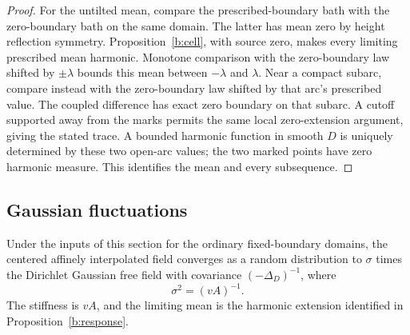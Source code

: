\begin{proof}
For the untilted mean, compare the prescribed-boundary bath with the
zero-boundary bath on the same domain. The latter has mean zero by height
reflection symmetry. Proposition~\ref{b:cell}, with source zero, makes
every limiting prescribed mean harmonic. Monotone comparison with the
zero-boundary law shifted by $\pm\lambda$ bounds this mean between
$-\lambda$ and $\lambda$. Near a compact subarc, compare instead with
the zero-boundary law shifted by that arc's prescribed value. The
coupled difference has exact zero boundary on that subarc. A cutoff
supported away from the marks permits the same local zero-extension
argument, giving the stated trace. A bounded harmonic function in smooth
$D$ is uniquely determined by these two open-arc values; the two marked
points have zero harmonic measure. This identifies the mean and every
subsequence.
\end{proof}

\subsection{Gaussian fluctuations}

\begin{theorem}\label{b:gff}
Under the inputs of this section for the ordinary fixed-boundary domains,
the centered affinely interpolated field converges as a random distribution
to $\sigma$ times the Dirichlet Gaussian free field with covariance
$(-\Delta_D)^{-1}$, where
\[
 \sigma^2=(vA)^{-1}.
\]
The stiffness is $vA$, and the limiting mean is the harmonic extension
identified in Proposition~\ref{b:response}.
\end{theorem}

